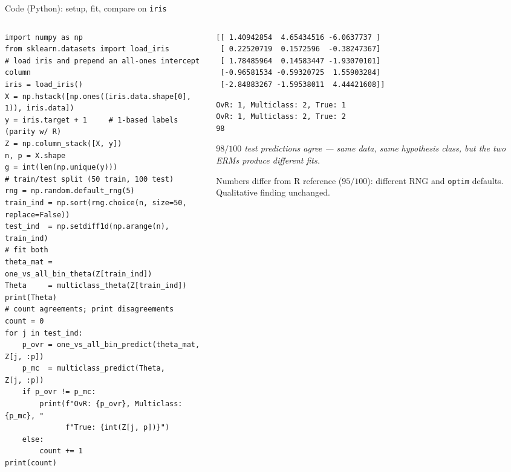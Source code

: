 \documentclass[aspectratio=169]{beamer}
\begin{document}
\begin{frame}[fragile]{Code (Python): setup, fit, compare on \texttt{iris}}
	\scriptsize
	\begin{columns}[T]
	\begin{column}{0.55\textwidth}
		\begin{lstlisting}[style=Pystyle, basicstyle=\ttfamily\fontsize{5.5pt}{6.5pt}\selectfont]
import numpy as np
from sklearn.datasets import load_iris
# load iris and prepend an all-ones intercept column
iris = load_iris()
X = np.hstack([np.ones((iris.data.shape[0], 1)), iris.data])
y = iris.target + 1     # 1-based labels (parity w/ R)
Z = np.column_stack([X, y])
n, p = X.shape
g = int(len(np.unique(y)))
# train/test split (50 train, 100 test)
rng = np.random.default_rng(5)
train_ind = np.sort(rng.choice(n, size=50, replace=False))
test_ind  = np.setdiff1d(np.arange(n), train_ind)
# fit both
theta_mat = one_vs_all_bin_theta(Z[train_ind])
Theta     = multiclass_theta(Z[train_ind])
print(Theta)
# count agreements; print disagreements
count = 0
for j in test_ind:
    p_ovr = one_vs_all_bin_predict(theta_mat, Z[j, :p])
    p_mc  = multiclass_predict(Theta,        Z[j, :p])
    if p_ovr != p_mc:
        print(f"OvR: {p_ovr}, Multiclass: {p_mc}, "
              f"True: {int(Z[j, p])}")
    else:
        count += 1
print(count)
		\end{lstlisting}
	\end{column}
	\begin{column}{0.45\textwidth}
		\begin{lstlisting}[style=Routstyle, basicstyle=\ttfamily\fontsize{6pt}{7pt}\selectfont]
[[ 1.40942854  4.65434516 -6.0637737 ]
 [ 0.22520719  0.1572596  -0.38247367]
 [ 1.78485964  0.14583447 -1.93070101]
 [-0.96581534 -0.59320725  1.55903284]
 [-2.84883267 -1.59538011  4.44421608]]
		\end{lstlisting}

		\vspace{4pt}
		\begin{lstlisting}[style=Routstyle, basicstyle=\ttfamily\fontsize{6pt}{7pt}\selectfont]
OvR: 1, Multiclass: 2, True: 1
OvR: 1, Multiclass: 2, True: 2
98
		\end{lstlisting}

		\vspace{4pt}
		{\scriptsize \emph{$98/100$ test predictions agree --- same data, same hypothesis class, but the two ERMs produce different fits.}}

		\vspace{4pt}
		\begin{tcolorbox}[
			colback=yellow!10, colframe=yellow!60!black,
			boxrule=0.5pt, arc=2pt,
			left=4pt, right=4pt, top=2pt, bottom=2pt,
			title=Note, fonttitle=\scriptsize\bfseries,
			boxsep=2pt, fontupper=\scriptsize
		]
			Numbers differ from R reference ($95/100$): different RNG and \texttt{optim} defaults. Qualitative finding unchanged.
		\end{tcolorbox}
	\end{column}
	\end{columns}
\end{frame}
\end{document}
